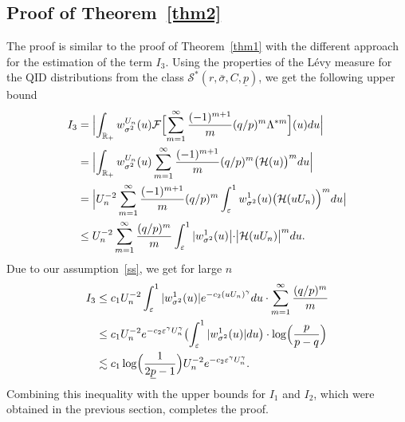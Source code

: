 \documentclass[a4paper,11pt]{article}
\theoremstyle{definition}
\renewcommand{\H}{\mathcal{H}}
\newcommand{\I}{{\rm{1}}}
\newcommand{\R}{{\mathbb{R}}}
\newcommand{\1}{\mathbb{I}}
\def\R{\mathbb{R}}
\newcommand{\eps}{\varepsilon}
\newcommand{\e}{e}
\newcommand{\F}{\mathcal{F}}
\theoremstyle{remark}
\begin{document}
\subsection{Proof of Theorem~\ref{thm2}}
The proof is similar to the proof of Theorem~\ref{thm1} with the different approach for the estimation of the term $I_3$. Using the properties of the L{\'e}vy measure for the QID distributions from the class $\mathcal{S}^*(r, \bar{\sigma}, C,\underline{p})$, we get the following upper bound
\begin{align*}
    I_3 &=  \Bigl|\int_{\R_+} w^{U_n}_{\sigma^2}(u) \F \Bigl[ \sum_{m = 1}^{\infty} \frac{(-1)^{m + 1}}{m} (q/p)^m\Lambda^{*m} \Bigr](u)du \Bigr| \\
    &= \Bigl|\int_{\R_+} w^{U_n}_{\sigma^2}(u) \sum_{m = 1}^{\infty} \frac{(-1)^{m + 1}}{m} (q/p)^m \bigl(\H(u)\bigr)^m du \Bigr| \\
    &= \Bigl|U_n^{-2}\sum_{m=1}^{\infty} \frac{(-1)^{m + 1}}{m} (q/p)^m \int_{\varepsilon}^{1} w^{1}_{\sigma^2}(u)\bigl(\H(uU_n)\Bigr)^m du \bigr| \\
    &\leq U_n^{-2} \sum_{m=1}^{\infty} \frac{(q/p)^m}{m}   \int_{\varepsilon}^{1} |w^{1}_{\sigma^2}(u)\bigl|\cdot \bigl| \H(uU_n)\bigr|^m du.
\end{align*}
Due to our assumption~\eqref{ss}, we get
for  large \(n\) \begin{align*}
    I_3
    &\leq c_1 U_n^{-2} \int_{\varepsilon}^{1} |w^{1}_{\sigma^2}(u)| e^{-c_2(u U_n)^{\gamma}} du  \cdot \sum_{m=1}^{\infty} \frac{(q/p)^m}{m} \\
    &\leq c_1U_n^{-2} e^{-c_2 \eps^{\gamma} U_n^{\gamma}}\bigl(\int_{\varepsilon}^{1} |w^{1}_{\sigma^2}(u)| du \bigr)  \cdot \log\Bigl( \frac{p}{p-q} \Bigr)   \\
    &\lesssim c_1  \log\Bigl( \frac{1}{2 \underline{p}-1} \Bigr)  U_n^{-2} \e^{-c_2 \eps^{\gamma} U_n^{\gamma}}.
\end{align*}
Combining this inequality with the upper bounds for \(I_1\) and \(I_2\), which were obtained in the previous section, completes the proof.
\end{document}
